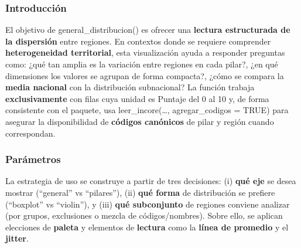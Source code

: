 \documentclass[
  11pt,
  letterpaper,
  DIV=11,
  numbers=noendperiod]{scrartcl}
\begin{document}
\subsubsection{\texorpdfstring{\textbf{Introducción}}{Introducción}}\label{introducciuxf3n-4}

El objetivo de general\_distribucion() es ofrecer una \textbf{lectura
estructurada de la dispersión} entre regiones. En contextos donde se
requiere comprender \textbf{heterogeneidad territorial}, esta
visualización ayuda a responder preguntas como: ¿qué tan amplia es la
variación entre regiones en cada pilar?, ¿en qué dimensiones los valores
se agrupan de forma compacta?, ¿cómo se compara la \textbf{media
nacional} con la distribución subnacional? La función trabaja
\textbf{exclusivamente} con filas cuya unidad es Puntaje del 0 al 10 y,
de forma consistente con el paquete, usa leer\_incore(\ldots,
agregar\_codigos = TRUE) para asegurar la disponibilidad de
\textbf{códigos canónicos} de pilar y región cuando correspondan.

\subsubsection{\texorpdfstring{\textbf{Parámetros}}{Parámetros}}\label{paruxe1metros-3}

La estrategia de uso se construye a partir de tres decisiones: (i)
\textbf{qué eje} se desea mostrar (``general'' vs ``pilares''), (ii)
\textbf{qué forma} de distribución se prefiere (``boxplot'' vs
``violin''), y (iii) \textbf{qué subconjunto} de regiones conviene
analizar (por grupos, exclusiones o mezcla de códigos/nombres). Sobre
ello, se aplican elecciones de \textbf{paleta} y elementos de
\textbf{lectura} como la \textbf{línea de promedio} y el
\textbf{jitter}.
\end{document}
